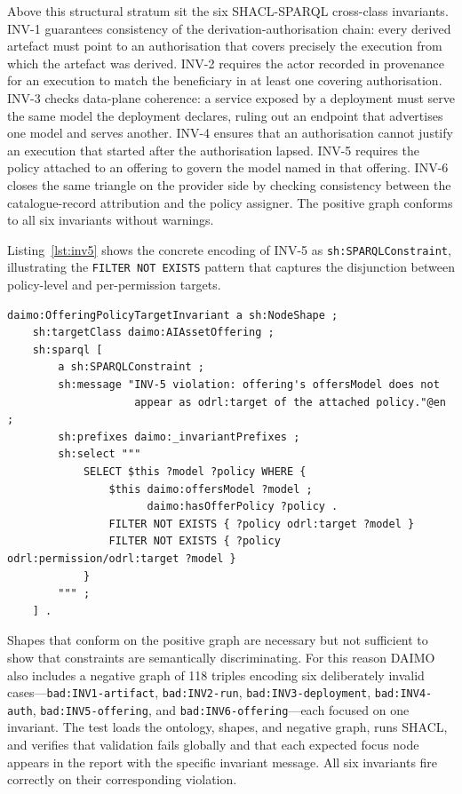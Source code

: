 \documentclass[Afour,sagev,times]{sagej}
\newcommand{\code}[1]{\texttt{#1}}
\begin{document}
Above this structural stratum sit the six SHACL-SPARQL cross-class invariants. INV-1 guarantees consistency of the derivation-authorisation chain: every derived artefact must point to an authorisation that covers precisely the execution from which the artefact was derived. INV-2 requires the actor recorded in provenance for an execution to match the beneficiary in at least one covering authorisation. INV-3 checks data-plane coherence: a service exposed by a deployment must serve the same model the deployment declares, ruling out an endpoint that advertises one model and serves another. INV-4 ensures that an authorisation cannot justify an execution that started after the authorisation lapsed. INV-5 requires the policy attached to an offering to govern the model named in that offering. INV-6 closes the same triangle on the provider side by checking consistency between the catalogue-record attribution and the policy assigner. The positive graph conforms to all six invariants without warnings.

Listing~\ref{lst:inv5} shows the concrete encoding of INV-5 as \code{sh:SPARQLConstraint}, illustrating the \code{FILTER NOT EXISTS} pattern that captures the disjunction between policy-level and per-permission targets.

\begin{lstlisting}[label=lst:inv5,caption={INV-5 encoded as a \code{sh:SPARQLConstraint}.}]
daimo:OfferingPolicyTargetInvariant a sh:NodeShape ;
    sh:targetClass daimo:AIAssetOffering ;
    sh:sparql [
        a sh:SPARQLConstraint ;
        sh:message "INV-5 violation: offering's offersModel does not
                    appear as odrl:target of the attached policy."@en ;
        sh:prefixes daimo:_invariantPrefixes ;
        sh:select """
            SELECT $this ?model ?policy WHERE {
                $this daimo:offersModel ?model ;
                      daimo:hasOfferPolicy ?policy .
                FILTER NOT EXISTS { ?policy odrl:target ?model }
                FILTER NOT EXISTS { ?policy odrl:permission/odrl:target ?model }
            }
        """ ;
    ] .
\end{lstlisting}

Shapes that conform on the positive graph are necessary but not sufficient to show that constraints are semantically discriminating. For this reason DAIMO also includes a negative graph of 118 triples encoding six deliberately invalid cases---\code{bad:INV1-artifact}, \code{bad:INV2-run}, \code{bad:INV3-deployment}, \code{bad:INV4-auth}, \code{bad:INV5-offering}, and \code{bad:INV6-offering}---each focused on one invariant. The test loads the ontology, shapes, and negative graph, runs SHACL, and verifies that validation fails globally and that each expected focus node appears in the report with the specific invariant message. All six invariants fire correctly on their corresponding violation.
\end{document}
